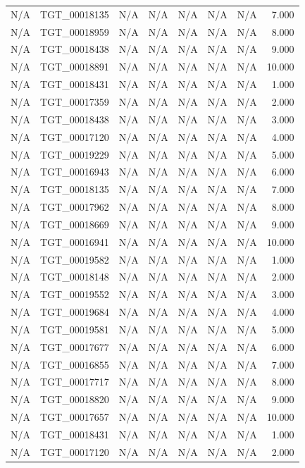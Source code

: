\begin{table}[h!]
\begin{tabular}{lrrrrrrr}
N/A & TGT\_00018135 & N/A & N/A & N/A & N/A & N/A & 7.000 \\
N/A & TGT\_00018959 & N/A & N/A & N/A & N/A & N/A & 8.000 \\
N/A & TGT\_00018438 & N/A & N/A & N/A & N/A & N/A & 9.000 \\
N/A & TGT\_00018891 & N/A & N/A & N/A & N/A & N/A & 10.000 \\
N/A & TGT\_00018431 & N/A & N/A & N/A & N/A & N/A & 1.000 \\
N/A & TGT\_00017359 & N/A & N/A & N/A & N/A & N/A & 2.000 \\
N/A & TGT\_00018438 & N/A & N/A & N/A & N/A & N/A & 3.000 \\
N/A & TGT\_00017120 & N/A & N/A & N/A & N/A & N/A & 4.000 \\
N/A & TGT\_00019229 & N/A & N/A & N/A & N/A & N/A & 5.000 \\
N/A & TGT\_00016943 & N/A & N/A & N/A & N/A & N/A & 6.000 \\
N/A & TGT\_00018135 & N/A & N/A & N/A & N/A & N/A & 7.000 \\
N/A & TGT\_00017962 & N/A & N/A & N/A & N/A & N/A & 8.000 \\
N/A & TGT\_00018669 & N/A & N/A & N/A & N/A & N/A & 9.000 \\
N/A & TGT\_00016941 & N/A & N/A & N/A & N/A & N/A & 10.000 \\
N/A & TGT\_00019582 & N/A & N/A & N/A & N/A & N/A & 1.000 \\
N/A & TGT\_00018148 & N/A & N/A & N/A & N/A & N/A & 2.000 \\
N/A & TGT\_00019552 & N/A & N/A & N/A & N/A & N/A & 3.000 \\
N/A & TGT\_00019684 & N/A & N/A & N/A & N/A & N/A & 4.000 \\
N/A & TGT\_00019581 & N/A & N/A & N/A & N/A & N/A & 5.000 \\
N/A & TGT\_00017677 & N/A & N/A & N/A & N/A & N/A & 6.000 \\
N/A & TGT\_00016855 & N/A & N/A & N/A & N/A & N/A & 7.000 \\
N/A & TGT\_00017717 & N/A & N/A & N/A & N/A & N/A & 8.000 \\
N/A & TGT\_00018820 & N/A & N/A & N/A & N/A & N/A & 9.000 \\
N/A & TGT\_00017657 & N/A & N/A & N/A & N/A & N/A & 10.000 \\
N/A & TGT\_00018431 & N/A & N/A & N/A & N/A & N/A & 1.000 \\
N/A & TGT\_00017120 & N/A & N/A & N/A & N/A & N/A & 2.000 \\

\end{tabular}
\end{table}
